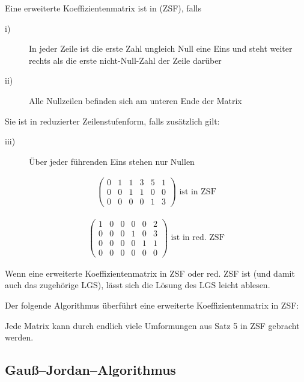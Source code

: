 Eine erweiterte Koeffizientenmatrix ist in  (ZSF), falls

\begin{description}
\item[i)]{In jeder Zeile ist die erste Zahl ungleich Null eine Eins und steht weiter rechts als die erste nicht-Null-Zahl der Zeile darüber}
\item[ii)]{Alle Nullzeilen befinden sich am unteren Ende der Matrix}
\end{description}
Sie ist in reduzierter Zeilenstufenform, falls zusätzlich gilt:
\begin{description}
\item[iii)]{Über jeder führenden Eins stehen nur Nullen}
\end{description}

\begin{align*}
    \left(\begin{array}{ccccc|c}
        0 & 1 & 1 & 3 & 5 & 1 \\
        0 & 0 & 1 & 1 & 0 & 0 \\
        0 & 0 & 0 & 0 & 1 & 3
    \end{array}\right) \text{ ist in ZSF}
\end{align*}

\begin{align*}
    \left(\begin{array}{ccccc|c}
        1 & 0 & 0 & 0 & 0 & 2 \\
        0 & 0 & 0 & 1 & 0 & 3 \\
        0 & 0 & 0 & 0 & 1 & 1 \\
        0 & 0 & 0 & 0 & 0 & 0
    \end{array}\right) \text{ ist in red. ZSF}
\end{align*}

Wenn eine erweiterte Koeffizientenmatrix in ZSF oder red. ZSF ist (und damit auch das zugehörige LGS), lässt sich die Lösung des LGS leicht ablesen.

Der folgende Algorithmus überführt eine erweiterte Koeffizientenmatrix in ZSF:

Jede Matrix kann durch endlich viele Umformungen aus Satz 5 in ZSF gebracht werden.

\subsection{Gauß--Jordan--Algorithmus}

